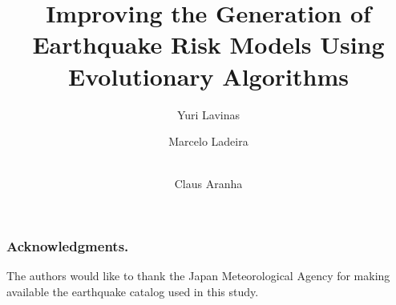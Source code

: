 \documentclass{llncs}
\begin{document}
\title{Improving the Generation of Earthquake Risk Models Using
  Evolutionary Algorithms}

\author{
  Yuri Lavinas \and
  Marcelo Ladeira \and \\ 
  Claus Aranha
}

\maketitle

\begin{abstract}

\end{abstract}


 






\subsubsection*{Acknowledgments.} 
The authors would like to thank the Japan Meteorological Agency for
making available the earthquake catalog used in this study.



\end{document}
